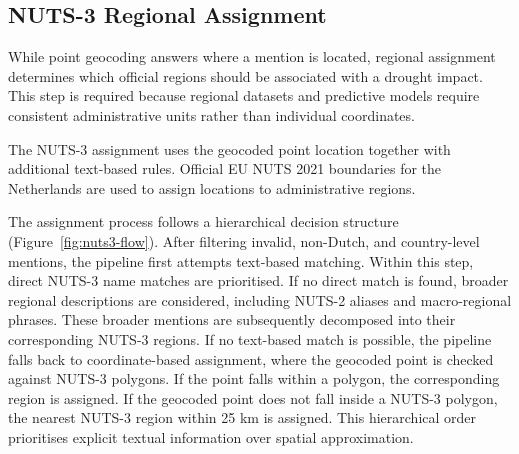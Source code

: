 

\subsection{NUTS-3 Regional Assignment}

While point geocoding answers where a mention is located, regional assignment determines which official regions should be associated with a drought impact. This step is required because regional datasets and predictive models require consistent administrative units rather than individual coordinates.

The NUTS-3 assignment uses the geocoded point location together with additional text-based rules. Official EU NUTS 2021 boundaries for the Netherlands are used to assign locations to administrative regions.

The assignment process follows a hierarchical decision structure (Figure~\ref{fig:nuts3-flow}). After filtering invalid, non-Dutch, and country-level mentions, the pipeline first attempts text-based matching. Within this step, direct NUTS-3 name matches are prioritised. If no direct match is found, broader regional descriptions are considered, including NUTS-2 aliases and macro-regional phrases. These broader mentions are subsequently decomposed into their corresponding NUTS-3 regions. If no text-based match is possible, the pipeline falls back to coordinate-based assignment, where the geocoded point is checked against NUTS-3 polygons. If the point falls within a polygon, the corresponding region is assigned. If the geocoded point does not fall inside a NUTS-3 polygon, the nearest NUTS-3 region within 25 km is assigned.
This hierarchical order prioritises explicit textual information over spatial approximation.

